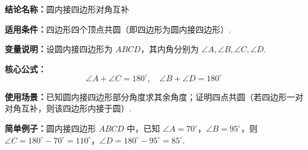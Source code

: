 \textbf{结论名称：}圆内接四边形对角互补

\textbf{适用条件：}四边形四个顶点共圆（即四边形为圆内接四边形）.

\textbf{变量说明：}设圆内接四边形为 \(ABCD\)，其内角分别为 \(\angle A,\angle B,\angle C,\angle D\).

\textbf{核心公式：}
\[
\boxed{\angle A+\angle C=180^\circ,\quad \angle B+\angle D=180^\circ}
\]

\textbf{使用场景：}已知圆内接四边形部分角度求其余角度；证明四点共圆（若四边形一对对角互补，则该四边形内接于圆）.

\textbf{简单例子：}圆内接四边形 \(ABCD\) 中，已知 \(\angle A=70^\circ\)，\(\angle B=95^\circ\)，则 \(\angle C=180^\circ-70^\circ=110^\circ\)，\(\angle D=180^\circ-95^\circ=85^\circ\).